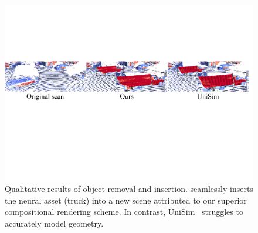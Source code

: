 \begin{figure}[t]
    \includegraphics[width=1.0\linewidth]{Figures/vehicle_insertion.pdf}
    
    \caption{
    Qualitative results of object removal and insertion. \dynfl seamlessly inserts the neural asset (truck) into a new scene attributed to our superior compositional rendering scheme. In contrast, UniSim~\cite{yang2023unisim} struggles to accurately model geometry.
    }
    \label{fig:vehicle_insertion}
\end{figure}